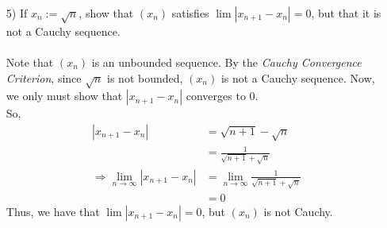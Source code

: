 \documentclass[12pt,letterpaper]{article}
\theoremstyle{case}
\theoremstyle{definition}
\begin{document}
\begin{enumerate}
\begin{enumerate}
\begin{proof}
			\end{proof}
			
			\item[5)] If $x_n:= \sqrt{n}$, show that $(x_n)$ satisfies $\lim |x_{n+1}-x_n|=0$, but that it is not a Cauchy sequence.
			\\\\Note that $(x_n)$ is an unbounded sequence. By the \textit{Cauchy Convergence Criterion}, since $\sqrt{n}$ is not bounded, $(x_n)$ is not a Cauchy sequence. Now, we only must show that $|x_{n+1}-x_n|$ converges to 0. 
			\\So,
			\begin{align*}
				|x_{n+1}-x_n| &= \sqrt{n+1}-\sqrt{n} \\
				&= \frac{1}{\sqrt{n+1}+\sqrt{n}} \\
				\Rightarrow \lim\limits_{n \to \infty} |x_{n+1}-x_n| &= \lim\limits_{n \to \infty} \frac{1}{\sqrt{n+1}+\sqrt{n}} \\
				&=0
			\end{align*}
			Thus, we have that $\lim |x_{n+1}-x_n|=0$, but $(x_n)$ is not Cauchy.\\
			

\end{enumerate}
\end{enumerate}
\end{document}
